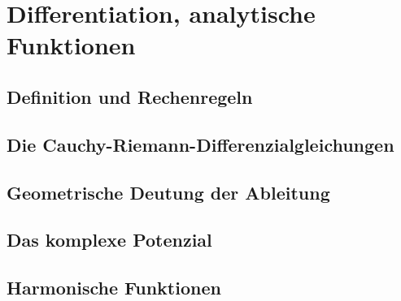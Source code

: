 \section{Differentiation, analytische Funktionen}

\subsection{Definition und Rechenregeln}

\subsection{Die Cauchy-Riemann-Differenzialgleichungen}

\subsection{Geometrische Deutung der Ableitung}

\subsection{Das komplexe Potenzial}

\subsection{Harmonische Funktionen}
